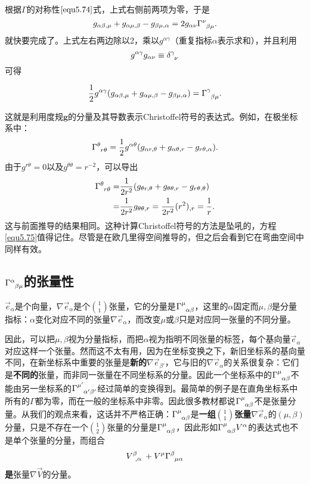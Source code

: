 根据$\Gamma$的对称性$\eqref{equ5.74}$式，上式右侧前两项为零，于是
\[
    g_{\alpha \beta, \mu} + g_{\alpha \mu, \beta} - g_{\beta \mu, \alpha} = 2 g_{\alpha \nu} \Gamma\indices{^\nu_{\beta \mu}}.
\]
就快要完成了。上式左右两边除以2，乘以$g^{\alpha \gamma}$（重复指标$\alpha$表示求和），并且利用
\[
    g^{\alpha \gamma} g_{\alpha \nu} \equiv \delta\indices{^\gamma_\nu}
\]
可得
\begin{shaded}
\begin{equation}
    \frac{1}{2} g^{\alpha \gamma} (g_{\alpha \beta, \mu} + g_{\alpha \mu, \beta} - g_{\beta \mu, \alpha}  ) = \Gamma\indices{^\gamma_{\beta \mu}}.
\label{equ5.75}
\end{equation}
\end{shaded}
这就是利用度规$\bm{g}$的分量及其导数表示Christoffel符号的表达式。例如，在极坐标系中：
\[
    \Gamma\indices{^\theta_{r \theta}} = \frac{1}{2} g^{\alpha \theta} (g_{\alpha r, \theta} + g_{\alpha \theta, r} - g_{r \theta, \alpha}).
\]
由于$g^{r \theta} = 0$以及$g^{\theta \theta} = r^{-2}$，可以导出
\begin{align*}
    \Gamma\indices{^\theta_{r \theta}} =& \frac{1}{2r^2} (g_{\theta r, \theta} + g_{\theta \theta, r} - g_{r \theta, \theta}) \\
    =& \frac{1}{2r^2} g_{\theta \theta, r} = \frac{1}{2r^2} (r^2)_{, r} = \frac{1}{r}.
\end{align*}
这与前面推导的结果相同。这种计算Christoffel符号的方法是坠吼的，方程\eqref{equ5.75}值得记住。尽管是在欧几里得空间推导的，但之后会看到它在弯曲空间中同样有效。


\subsection*{$\Gamma\indices{^\alpha_{\beta \mu}}$的张量性}
$\vec{e}_\alpha$是个向量，$\nabla \vec{e}_\alpha$是个$\binom{1}{1}$张量，它的分量是$\Gamma\indices{^\mu_{\alpha \beta}}$，这里的$\alpha$固定而$\mu, \beta$是分量指标：$\alpha$变化对应不同的张量$\nabla \vec{e}_\alpha$，而改变$\mu$或$\beta$只是对应同一张量的不同分量。

因此，可以把$\mu, \beta$视为分量指标，而把$\alpha$视为指明不同张量的标签，每个基向量$\vec{e}_\alpha$对应这样一个张量。然而这不太有用，因为在坐标变换之下，新旧坐标系的基向量不同，在新坐标系中重要的张量是\textbf{新的}$\nabla \vec{e}_{\beta'}$，它与旧的$\nabla \vec{e}_\alpha$的关系很复杂：它们是\textbf{不同的}张量，而非同一张量在不同坐标系的分量。因此一个坐标系中的$\Gamma\indices{^\mu_{\alpha \beta}}$不能由另一坐标系的$\Gamma\indices{^{\mu'}_{\alpha'
 \beta'}}$经过简单的变换得到。最简单的例子是在直角坐标系中所有的$\Gamma$都为零，而在一般的坐标系中非零。因此很多教材都说$\Gamma\indices{^\mu_{\alpha \beta}}$不是张量分量。从我们的观点来看，这话并不严格正确：$\Gamma\indices{^\mu_{\alpha \beta}}$是\textbf{一组}$\binom{1}{1}$\textbf{张量}$\nabla \vec{e}_\alpha$的$(\mu, \beta)$分量，只是不存在一个$\binom{1}{2}$张量的分量是$\Gamma\indices{^\mu_{\alpha \beta}}$，因此形如$\Gamma\indices{^\mu_{\alpha \beta}} V^\alpha $的表达式也不是单个张量的分量，而组合
 \[
    V\indices{^\beta_{, \alpha}} + V^\mu \Gamma\indices{^\beta_{\mu \alpha}}
\]
\textbf{是}张量$\nabla \vec{V}$的分量。



